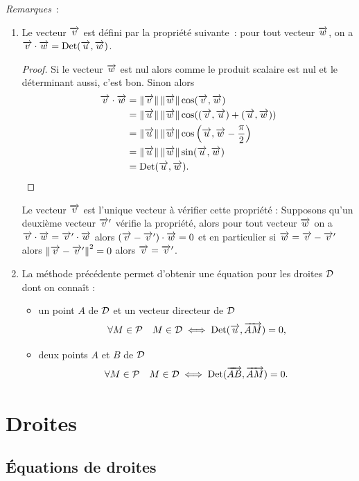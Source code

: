 \emph{Remarques}~:
\begin{enumerate}
\item Le vecteur \(\vv\) est défini par la propriété suivante~: pour tout vecteur \(\vw\), on a \(\vv \cdot \vw=\Det(\vu,\vw)\).
  \begin{proof}
    Si le vecteur \(\vw\) est nul alors comme le produit scalaire est nul et le déterminant aussi, c'est bon. Sinon alors 
    \begin{align}
      \vv\cdot\vw&=\norme{\vv}\norme{\vw}\cos(\vv,\vw)\\ 
      &=\norme{\vu}\norme{\vw} \cos((\vv,\vu) + (\vu,\vw))\\ 
      &=\norme{\vu}\norme{\vw} \cos\left(\vu,\vw -\frac{\pi}{2} \right)\\ 
      &=\norme{\vu} \norme{\vw} \sin(\vu,\vw) \\ 
      &=\Det(\vu,\vw).
    \end{align}
  \end{proof}
  Le vecteur \(\vv\) est l'unique vecteur à vérifier cette propriété : Supposons qu'un deuxième vecteur \(\vv'\) vérifie la propriété, alors pour tout vecteur \(\vw\) on a \(\vv \cdot \vw =\vv' \cdot \vw\) alors \((\vv-\vv') \cdot \vw=0\) et en particulier si \(\vw=\vv-\vv'\) alors \(\norme{\vv-\vv'}^2=0\) alors \(\vv=\vv'\).
\item La méthode précédente permet d'obtenir une équation pour les droites \(\Dr\) dont on connaît :
  \begin{itemize}
  \item un point \(A\) de \(\Dr\) et un vecteur directeur de \(\Dr\)
    \begin{equation}
      \forall M \in \P \quad M \in \Dr \iff \Det(\vu, \vect{AM})=0,
    \end{equation}
  \item deux points \(A\) et \(B\) de \(\Dr\) 
    \begin{equation}
      \forall M \in \P \quad M \in \Dr \iff \Det(\vect{AB}, \vect{AM})=0.
    \end{equation}
  \end{itemize}
\end{enumerate}

\section{Droites}
\subsection{Équations de droites}

